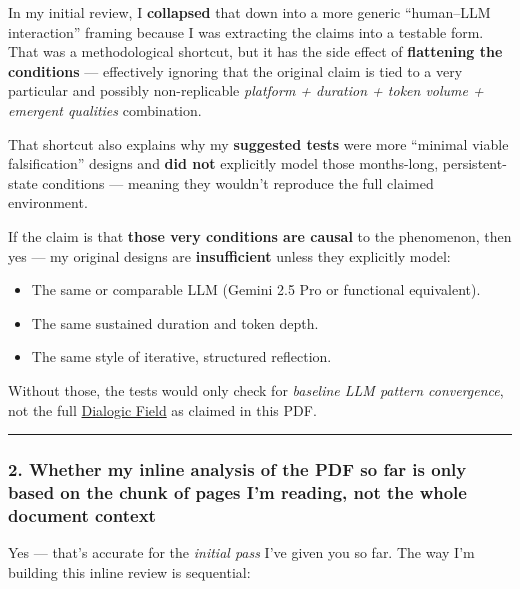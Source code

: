 \documentclass{article}
\begin{document}
In my initial review, I \textbf{collapsed} that down into a more generic ``human--LLM interaction'' framing because I was extracting the claims into a testable form. That was a methodological shortcut, but it has the side effect of \textbf{flattening the conditions} --- effectively ignoring that the original claim is tied to a very particular and possibly non-replicable \emph{platform + duration + token volume + emergent qualities} combination.

That shortcut also explains why my \textbf{suggested tests} were more ``minimal viable falsification'' designs and \textbf{did not} explicitly model those months-long, persistent-state conditions --- meaning they wouldn't reproduce the full claimed environment.

If the claim is that \textbf{those very conditions are causal} to the phenomenon, then yes --- my original designs are \textbf{insufficient} unless they explicitly model:

\begin{itemize}
\item
  The same or comparable LLM (Gemini 2.5 Pro or functional equivalent).
\item
  The same sustained duration and token depth.
\item
  The same style of iterative, structured reflection.
\end{itemize}

Without those, the tests would only check for \emph{baseline LLM pattern convergence}, not the full \hyperlink{gloss:dialogic_field}{Dialogic Field} as claimed in this PDF.

\begin{center}\rule{0.5\linewidth}{0.5pt}\end{center}

\subsubsection*{2. Whether my inline analysis of the PDF so far is only based on the chunk of pages I'm reading, not the whole document context}\label{whether-my-inline-analysis-of-the-pdf-so-far-is-only-based-on-the-chunk-of-pages-im-reading-not-the-whole-document-context}

Yes --- that's accurate for the \emph{initial pass} I've given you so far. The way I'm building this inline review is sequential:
\end{document}
